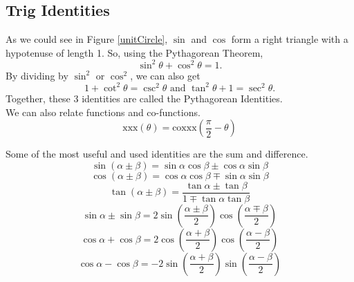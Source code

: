 \subsection{Trig Identities}
\noindent
As we could see in Figure \ref{unitCircle}, $\sin$ and $\cos$ form a right triangle with a hypotenuse of length 1.
So, using the Pythagorean Theorem,
\begin{equation*}
	\sin^2{\theta} + \cos^2{\theta} = 1.
\end{equation*}
By dividing by $\sin^2$ or $\cos^2$, we can also get
\begin{equation*}
	1 + \cot^2{\theta} = \csc^2{\theta} \text{ and } \tan^2{\theta} + 1 = \sec^2{\theta}.
\end{equation*}
Together, these 3 identities are called the Pythagorean Identities.\\

\noindent
We can also relate functions and co-functions.
\begin{equation*}
	\text{xxx}(\theta) = \text{coxxx}\left(\frac{\pi}{2} - \theta\right)
\end{equation*}

\noindent
Some of the most useful and used identities are the sum and difference.
\begin{equation*}
	\sin{\left(\alpha \pm \beta\right)} = \sin{\alpha}\cos{\beta} \pm \cos{\alpha}\sin{\beta}
\end{equation*} \begin{equation*}
	\cos{\left(\alpha \pm \beta\right)} = \cos{\alpha}\cos{\beta} \mp \sin{\alpha}\sin{\beta}
\end{equation*} \begin{equation*}
	\tan{\left(\alpha \pm \beta\right)} = \frac{\tan{\alpha} \pm \tan{\beta}}{1 \mp \tan{\alpha}\tan{\beta}}
\end{equation*} \begin{equation*}
	\sin{\alpha} \pm \sin{\beta} = 2\sin{\left(\frac{\alpha \pm \beta}{2}\right)}\cos{\left(\frac{\alpha \mp \beta}{2}\right)}
\end{equation*} \begin{equation*}
	\cos{\alpha} + \cos{\beta} = 2\cos{\left(\frac{\alpha + \beta}{2}\right)}\cos{\left(\frac{\alpha - \beta}{2}\right)}
\end{equation*} \begin{equation*}
	\cos{\alpha} - \cos{\beta} = -2\sin{\left(\frac{\alpha + \beta}{2}\right)}\sin{\left(\frac{\alpha - \beta}{2}\right)}
\end{equation*}
